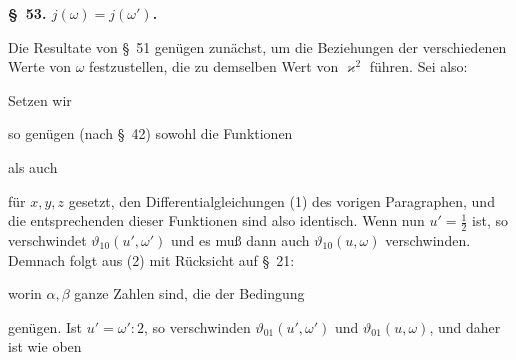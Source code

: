 
\begin{center}
\textbf{\S\ 53.  $j(\omega) = j(\omega')$.}
\end{center}

Die Resultate von \S\ 51 gen\"ugen zun\"achst, um die Beziehungen der verschiedenen Werte von $\omega$ festzustellen, die zu demselben Wert von $\varkappa^2$ f\"uhren. Sei also:


Setzen wir


so gen\"ugen (nach \S\ 42) sowohl die Funktionen


als auch


f\"ur $x,y,z$ gesetzt, den Differentialgleichungen (1) des vorigen Paragraphen, und die entsprechenden dieser Funktionen sind also identisch. Wenn nun $u'=\frac{1}{2}$ ist, so verschwindet $\vartheta_{10}(u',\omega')$ und es mu\ss{} dann auch $\vartheta_{10}(u,\omega)$ verschwinden. Demnach folgt aus (2) mit R\"ucksicht auf \S\ 21:


worin $\alpha,\beta$ ganze Zahlen sind, die der Bedingung


gen\"ugen. Ist $u'=\omega':2$, so verschwinden $\vartheta_{01}(u',\omega')$ und $\vartheta_{01}(u,\omega)$, und daher ist wie oben

